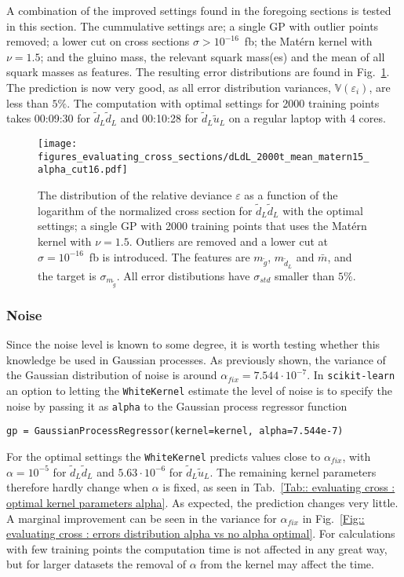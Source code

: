 \documentclass[twoside,english]{uiofysmaster}
\begin{document}
A combination of the improved settings found in the foregoing sections is tested in this section. The cummulative settings are; a single GP with outlier points removed; a lower cut on cross sections $\sigma > 10^{-16}$~fb; the Mat\'{e}rn kernel with $\nu=1.5$; and the gluino mass, the relevant squark mass(es) and the mean of all squark masses as features. The resulting error distributions are found in Fig.~\ref{Fig:: evaluating cross : error distribution dLdL optimal}. The prediction is now very good, as all error distribution variances, $\mathbb{V}(\varepsilon_i)$, are less than $5\%$. The computation with optimal settings for 2000 training points takes 00:09:30 for $\tilde{d}_L \tilde{d}_L$ and 00:10:28 for $\tilde{d}_L \tilde{u}_L$ on a regular laptop with 4 cores. 

\begin{figure}
\centering
\texttt{[image: figures\_evaluating\_cross\_sections/dLdL\_2000t\_mean\_matern15\_alpha\_cut16.pdf]}
\caption{The distribution of the relative deviance $\varepsilon$ as a function of the logarithm of the normalized cross section for $\tilde{d}_L \tilde{d}_L$ with the optimal settings; a single GP with 2000 training points that uses the Mat\'{e}rn kernel with $\nu=1.5$. Outliers are removed and a lower cut at $\sigma=10^{-16}$~fb is introduced. The features are $m_{\tilde{g}}$, $m_{\tilde{d}_L}$ and $\bar{m}$, and the target is $\sigma_{m_{\tilde{g}}}$. All error distibutions have $\sigma_{std}$ smaller than $5\%$.}
\label{Fig:: evaluating cross : error distribution dLdL optimal}
\end{figure}

\subsubsection{Noise}

Since the noise level is known to some degree, it is worth testing whether this knowledge be used in Gaussian processes. As previously shown, the variance of the Gaussian distribution of noise is around $\alpha_{fix} = 7.544 \cdot 10^{-7}$. In \verb|scikit-learn| an option to letting the \verb|WhiteKernel| estimate the level of noise is to specify the noise by passing it as \verb|alpha| to the Gaussian process regressor function
\begin{lstlisting}
gp = GaussianProcessRegressor(kernel=kernel, alpha=7.544e-7)
\end{lstlisting}
For the optimal settings the \verb|WhiteKernel| predicts values close to $\alpha_{fix}$, with $\alpha=10^{-5}$ for $\tilde{d}_L \tilde{d}_L$ and $5.63 \cdot 10^{-6}$ for $\tilde{d}_L \tilde{u}_L$. The remaining kernel parameters therefore hardly change when $\alpha$ is fixed, as seen in Tab.~\ref{Tab:: evaluating cross : optimal kernel parameters alpha}. As expected, the prediction changes very little. A marginal improvement can be seen in the variance for $\alpha_{fix}$ in Fig.~\ref{Fig:: evaluating cross : errors distribution alpha vs no alpha optimal}. For calculations with few training points the computation time is not affected in any great way, but for larger datasets the removal of $\alpha$ from the kernel may affect the time. 
\end{document}
